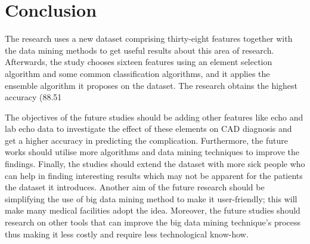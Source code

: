 \documentclass[sigconf]{acmart}
\begin{document}
\section{Conclusion}
The research uses a new dataset comprising thirty-eight features together with the data mining methods to get useful results about this area of research. Afterwards, the study chooses sixteen features using an element selection algorithm and some common classification algorithms, and it applies the ensemble algorithm it proposes on the dataset. The research obtains the highest accuracy (88.51%
\par The objectives of the future studies should be adding other features like echo and lab echo data to investigate the effect of these elements on CAD diagnosis and get a higher accuracy in predicting the complication. Furthermore, the future works should utilise more algorithms and data mining techniques to improve the findings. Finally, the studies should extend the dataset with more sick people who can help in finding interesting results which may not be apparent for the patients the dataset it introduces. Another aim of the future research should be simplifying the use of big data mining method to make it user-friendly; this will make many medical facilities adopt the idea. Moreover, the future studies should research on other tools that can improve the big data mining technique's process thus making it less costly and require less technological know-how.
\end{document}
